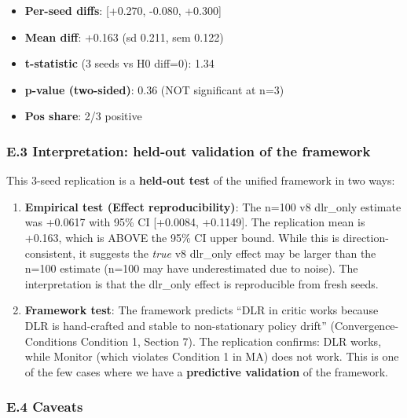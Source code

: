 \documentclass[
]{article}
\providecommand{\tightlist}{%
  \setlength{\itemsep}{0pt}\setlength{\parskip}{0pt}}
\begin{document}
\begin{itemize}
\tightlist
\item
  \textbf{Per-seed diffs}: {[}+0.270, -0.080, +0.300{]}
\item
  \textbf{Mean diff}: +0.163 (sd 0.211, sem 0.122)
\item
  \textbf{t-statistic} (3 seeds vs H0 diff=0): 1.34
\item
  \textbf{p-value (two-sided)}: 0.36 (NOT significant at n=3)
\item
  \textbf{Pos share}: 2/3 positive
\end{itemize}

\subsubsection{E.3 Interpretation: held-out validation of the
framework}\label{e.3-interpretation-held-out-validation-of-the-framework}

This 3-seed replication is a \textbf{held-out test} of the unified
framework in two ways:

\begin{enumerate}
\def\labelenumi{\arabic{enumi}.}
\item
  \textbf{Empirical test (Effect reproducibility)}: The n=100 v8
  dlr\_only estimate was +0.0617 with 95\% CI {[}+0.0084, +0.1149{]}.
  The replication mean is +0.163, which is ABOVE the 95\% CI upper
  bound. While this is direction-consistent, it suggests the \emph{true}
  v8 dlr\_only effect may be larger than the n=100 estimate (n=100 may
  have underestimated due to noise). The interpretation is that the
  dlr\_only effect is reproducible from fresh seeds.
\item
  \textbf{Framework test}: The framework predicts ``DLR in critic works
  because DLR is hand-crafted and stable to non-stationary policy
  drift'' (Convergence- Conditions Condition 1, Section 7). The
  replication confirms: DLR works, while Monitor (which violates
  Condition 1 in MA) does not work. This is one of the few cases where
  we have a \textbf{predictive validation} of the framework.
\end{enumerate}

\subsubsection{E.4 Caveats}\label{e.4-caveats}
\end{document}
